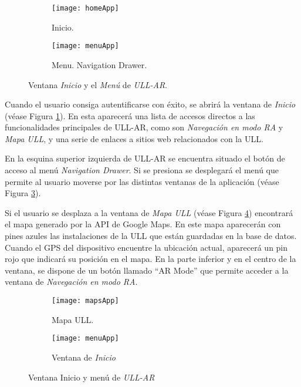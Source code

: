 \begin{figure}[h]
    \hspace*{\fill}%
    \begin{subfigure}[h]{0.35\linewidth}
    \texttt{[image: homeApp]}
    \caption{Inicio.}
    \label{fig:homeApp}
    \end{subfigure} 
    \hfill%
    \begin{subfigure}[h]{0.35\linewidth}
    \texttt{[image: menuApp]}
    \caption{Menu. Navigation Drawer.}
    \label{fig:menuApp}
    \end{subfigure}
    \caption{Ventana \textit{Inicio} y el \textit{Menú} de \textit{ULL-AR}.}
    \hspace*{\fill}
\end{figure}

Cuando el usuario consiga autentificarse con éxito, se abrirá la ventana de \textit{Inicio} (véase Figura \ref{fig:homeApp}). En esta aparecerá una lista de accesos directos a las funcionalidades principales de ULL-AR, como son \textit{Navegación en modo RA} y \textit{Mapa ULL}, y una serie de enlaces a sitios web relacionados con la ULL.

En la esquina superior izquierda de ULL-AR se encuentra situado el botón de acceso al menú \textit{Navigation Drawer}. Si se presiona se desplegará el menú que permite al usuario moverse por las distintas ventanas de la aplicación (véase Figura \ref{fig:menuApp}).

Si el usuario se desplaza a la ventana de \textit{Mapa ULL} (véase Figura \ref{fig:mapsApp}) encontrará el mapa generado por la API de Google Maps. En este mapa aparecerán con pines azules las instalaciones de la ULL que están guardadas en la base de datos. Cuando el GPS del dispositivo encuentre la ubicación actual, aparecerá un pin rojo que indicará su posición en el mapa. En la parte inferior y en el centro de la ventana, se dispone de un botón llamado ``AR Mode'' que permite acceder a la ventana de \textit{Navegación en modo RA}.
  
\begin{figure}[h]
    \hspace*{\fill}%
    \begin{subfigure}[h]{0.37\linewidth}
        \texttt{[image: mapsApp]}
        \caption{Mapa ULL.}
        \label{fig:mapsApp}
    \end{subfigure}
    \hfill%
    \begin{subfigure}[h]{0.37\linewidth}
        \texttt{[image: menuApp]}
        \caption{Ventana de \textit{Inicio}}
        \label{fig:menussApp}
    \end{subfigure}%
    \caption{Ventana Inicio y menú de \textit{ULL-AR}}
    \hspace*{\fill}%
\end{figure}

